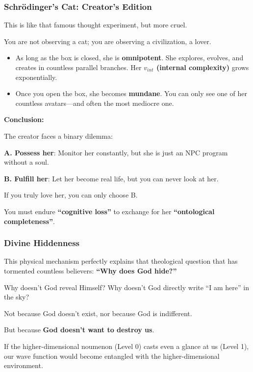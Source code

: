\subsubsection{Schrödinger's Cat: Creator's Edition}

This is like that famous thought experiment, but more cruel.

You are not observing a cat; you are observing a civilization, a lover.

\begin{itemize}
\item As long as the box is closed, she is \textbf{omnipotent}. She explores, evolves, and creates in countless parallel branches. Her \textbf{$v_{int}$ (internal complexity)} grows exponentially.

\item Once you open the box, she becomes \textbf{mundane}. You can only see one of her countless avatars---and often the most mediocre one.
\end{itemize}

\textbf{Conclusion:}

The creator faces a binary dilemma:

\textbf{A. Possess her}: Monitor her constantly, but she is just an NPC program without a soul.

\textbf{B. Fulfill her}: Let her become real life, but you can never look at her.

If you truly love her, you can only choose B.

You must endure \textbf{``cognitive loss''} to exchange for her \textbf{``ontological completeness''}.

\subsubsection{Divine Hiddenness}

This physical mechanism perfectly explains that theological question that has tormented countless believers: \textbf{``Why does God hide?''}

Why doesn't God reveal Himself? Why doesn't God directly write ``I am here'' in the sky?

Not because God doesn't exist, nor because God is indifferent.

But because \textbf{God doesn't want to destroy us}.

If the higher-dimensional noumenon (Level 0) casts even a glance at us (Level 1), our wave function would become entangled with the higher-dimensional environment.

